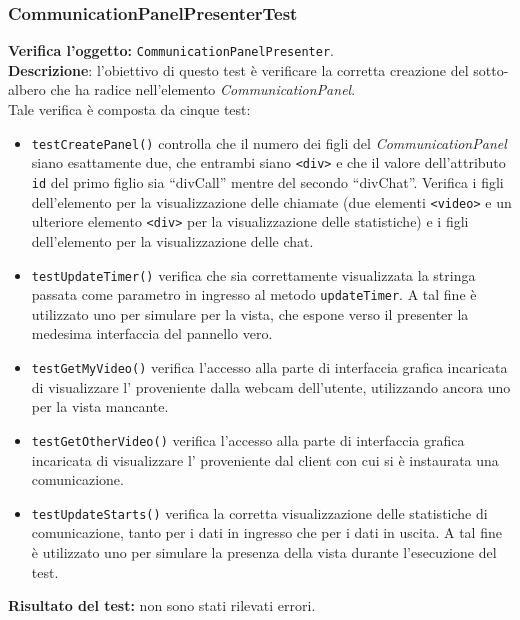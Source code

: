 \subsubsection{CommunicationPanelPresenterTest}
\textbf{Verifica l'oggetto:} \texttt{CommunicationPanelPresenter}.\\
\textbf{Descrizione}: l'obiettivo di questo test è verificare la corretta creazione del sotto-albero che ha radice nell'elemento \textit{CommunicationPanel}.\\
Tale verifica è composta da cinque test:
\begin{itemize}
\item \texttt{testCreatePanel()} controlla che il numero dei figli del \textit{CommunicationPanel} siano esattamente due, che entrambi siano \texttt{<div>} e che il valore dell'attributo \texttt{id} del primo figlio sia ``divCall'' mentre del secondo ``divChat''. Verifica i figli dell'elemento per la visualizzazione delle chiamate (due elementi \texttt{<video>} e un ulteriore elemento \texttt{<div>} per la visualizzazione delle statistiche) e i figli dell'elemento per la visualizzazione delle chat.
\item \texttt{testUpdateTimer()} verifica che sia correttamente visualizzata la stringa passata come parametro in ingresso al metodo \texttt{updateTimer}. A tal fine è utilizzato uno  per simulare per la vista, che espone verso il presenter la medesima interfaccia del pannello vero.
\item \texttt{testGetMyVideo()} verifica l'accesso alla parte di interfaccia grafica incaricata di visualizzare l' proveniente dalla webcam dell'utente, utilizzando ancora uno  per la vista mancante.
\item \texttt{testGetOtherVideo()} verifica l'accesso alla parte di interfaccia grafica incaricata di visualizzare l' proveniente dal client con cui si è instaurata una comunicazione.
\item \texttt{testUpdateStarts()} verifica la corretta visualizzazione delle statistiche di comunicazione, tanto per i dati in ingresso che per i dati in uscita. A tal fine è utilizzato uno  per simulare la presenza della vista durante l'esecuzione del test.
\end{itemize}
\textbf{Risultato del test:} non sono stati rilevati errori.

